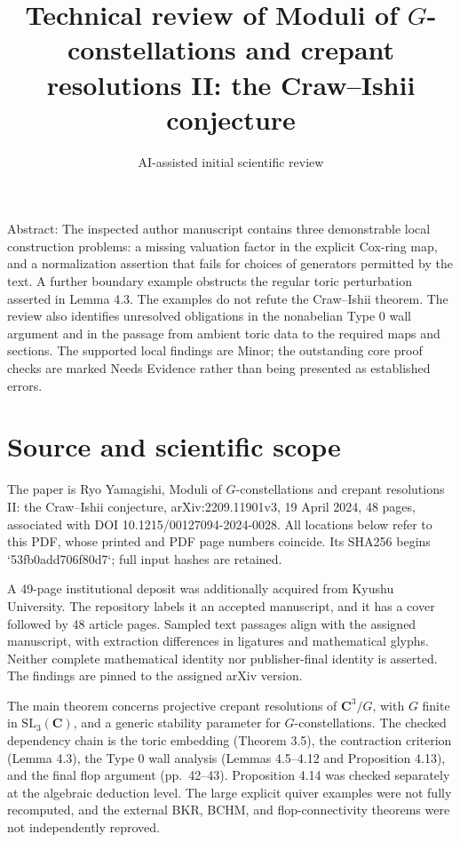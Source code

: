 \documentclass[10pt]{article}
\title{Technical review of
Moduli of \(G\)-constellations and crepant resolutions II:
the Craw–Ishii conjecture}
\author{AI-assisted initial scientific review}
\date{}
\begin{document}
\maketitle
Abstract: The inspected author manuscript contains three demonstrable local construction problems: a missing valuation factor in the explicit Cox-ring map, and a normalization assertion that fails for choices of generators permitted by the text. A further boundary example obstructs the regular toric perturbation asserted in Lemma 4.3. The examples do not refute the Craw–Ishii theorem. The review also identifies unresolved obligations in the nonabelian Type 0 wall argument and in the passage from ambient toric data to the required maps and sections. The supported local findings are Minor; the outstanding core proof checks are marked Needs Evidence rather than being presented as established errors.\par
\section*{Source and scientific scope}
The paper is Ryo Yamagishi, Moduli of \(G\)-constellations and crepant resolutions II: the Craw–Ishii conjecture, arXiv:2209.11901v3, 19 April 2024, 48 pages, associated with DOI 10.1215/00127094-2024-0028. All locations below refer to this PDF, whose printed and PDF page numbers coincide. Its SHA256 begins `53fb0add706f80d7`; full input hashes are retained.\par
A 49-page institutional deposit was additionally acquired from Kyushu University. The repository labels it an accepted manuscript, and it has a cover followed by 48 article pages. Sampled text passages align with the assigned manuscript, with extraction differences in ligatures and mathematical glyphs. Neither complete mathematical identity nor publisher-final identity is asserted. The findings are pinned to the assigned arXiv version.\par
The main theorem concerns projective crepant resolutions of \(\mathbf C^3/G\), with \(G\) finite in \(\mathrm{SL}_3(\mathbf C)\), and a generic stability parameter for \(G\)-constellations. The checked dependency chain is the toric embedding (Theorem 3.5), the contraction criterion (Lemma 4.3), the Type 0 wall analysis (Lemmas 4.5–4.12 and Proposition 4.13), and the final flop argument (pp. 42–43). Proposition 4.14 was checked separately at the algebraic deduction level. The large explicit quiver examples were not fully recomputed, and the external BKR, BCHM, and flop-connectivity theorems were not independently reproved.\par
\end{document}
